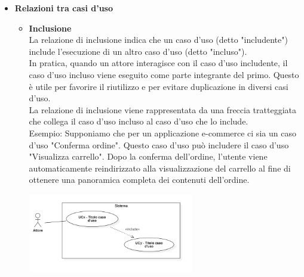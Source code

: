 \begin{itemize}
    \item \textbf{Relazioni tra casi d'uso} \\
    \begin{itemize}
        \item \textbf{Inclusione} \\
        La relazione di inclusione indica che un caso d'uso (detto "includente") include l'esecuzione di un altro caso d'uso (detto "incluso"). \\
        In pratica, quando un attore interagisce con il caso d'uso includente, il caso d'uso incluso viene eseguito come parte integrante del primo. Questo è utile per favorire il riutilizzo e per evitare duplicazione in diversi casi d'uso. \\
        La relazione di inclusione viene rappresentata da una freccia tratteggiata che collega il caso d'uso incluso al caso d'uso che lo include. \\
        Esempio: Supponiamo che per un applicazione e-commerce ci sia un caso d'uso "Conferma ordine". Questo caso d'uso può includere il caso d'uso "Visualizza carrello". Dopo la conferma dell'ordine, l'utente viene automaticamente reindirizzato alla visualizzazione del carrello al fine di ottenere una panoramica completa dei contenuti dell'ordine.
        \begin{minipage}[t]{\linewidth}
            \centering
            \includegraphics[width=0.6\textwidth]{../Images/NormeDiProgetto/Inclusione.PNG}
        \end{minipage}


\end{itemize}
\end{itemize}
